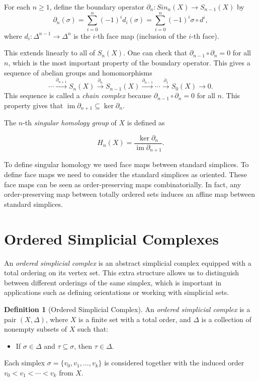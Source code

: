 \documentclass[11pt]{article}
\theoremstyle{definition}
\newtheorem{definition}{Definition}[section]
\theoremstyle{plain}
\begin{document}
For each $n \geq 1$, define the boundary operator $\partial_n : Sin_n(X) \to S_{n-1}(X)$ by
\[
    \partial_n(\sigma) = \sum_{i=0}^n (-1)^i d_i(\sigma) = \sum_{i=0}^n (-1)^i \sigma \circ d^i,
\]
where $d_i : \Delta^{n-1} \to \Delta^n$ is the $i$-th face map (inclusion of the $i$-th face).

This extends linearly to all of $S_n(X)$. One can check that $\partial_{n-1} \circ \partial_n = 0$ for all $n$, which is the most important property of the boundary operator.
This gives  a sequence of abelian groups and homomorphisms
\[
    \cdots \xrightarrow{\partial_{n+1}} S_n(X) \xrightarrow{\partial_n} S_{n-1}(X) \xrightarrow{\partial_{n-1}} \cdots \xrightarrow{\partial_1} S_0(X) \to 0.
\]
This sequence is called a \emph{ chain complex}  because $\partial_{n-1} \circ \partial_n = 0$ for all $n$. This property gives that  $\operatorname{im} \partial_{n+1} \subseteq \ker \partial_n$.

The $n$-th \emph{singular homology group} of $X$ is defined as

\[
    H_n(X) = \frac{\ker \partial_n}{\operatorname{im} \partial_{n+1}}.
\]

To define singular homology we used face maps between standard simplices. To define face maps we need to consider the standard simplices as oriented. These face maps can be seen as  order-preserving maps combinatorially. In fact, any order-preserving map between totally ordered sets induces an affine map between standard simplices.

\section{Ordered Simplicial Complexes}

An \emph{ordered simplicial complex} is an abstract simplicial complex equipped with a total ordering on its vertex set. This extra structure allows us to distinguish between different orderings of the same simplex, which is important in applications such as defining orientations or working with simplicial sets.

\begin{definition}[Ordered Simplicial Complex]
    An \emph{ordered simplicial complex} is a pair $(X, \Delta)$, where $X$ is a finite set with a total order, and $\Delta$ is a collection of nonempty subsets of $X$ such that:
    \begin{itemize}
        \item If $\sigma \in \Delta$ and $\tau \subseteq \sigma$, then $\tau \in \Delta$.
    \end{itemize}
    Each simplex $\sigma = \{v_0, v_1, \ldots, v_k\}$ is considered together with the induced order $v_0 < v_1 < \cdots < v_k$ from $X$.
\end{definition}
\end{document}
